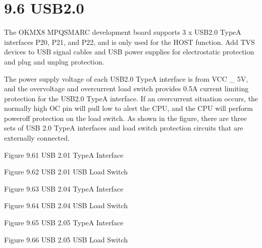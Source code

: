 \documentclass[letterpaper,10pt,openany,english]{sphinxmanual}
\begin{document}
\section{9.6 USB2.0}
\label{\detokenize{hardware:usb2-0}}
\sphinxAtStartPar
The OK\sphinxhyphen{}MX8 MPQ\sphinxhyphen{}SMARC development board supports 3 x USB2.0 Type\sphinxhyphen{}A interfaces P20, P21, and P22, and is only used for the HOST function. Add TVS devices to USB signal cables and USB power supplies for electrostatic protection and plug and unplug protection.

\sphinxAtStartPar
The power supply voltage of each USB2.0 Type\sphinxhyphen{}A interface is from VCC \_ 5V, and the overvoltage and overcurrent load switch provides 0.5A current limiting protection for the USB2.0 Type\sphinxhyphen{}A interface. If an overcurrent situation occurs, the normally high OC pin will pull low to alert the CPU, and the CPU will perform power\sphinxhyphen{}off protection on the load switch. As shown in the figure, there are three sets of USB 2.0 Type\sphinxhyphen{}A interfaces and load switch protection circuits that are externally connected.

\sphinxAtStartPar
{}

\sphinxAtStartPar
Figure 9.6\sphinxhyphen{}1 USB 2.0\sphinxhyphen{}1 Type\sphinxhyphen{}A Interface

\sphinxAtStartPar
{}

\sphinxAtStartPar
Figure 9.6\sphinxhyphen{}2 USB 2.0\sphinxhyphen{}1 USB Load Switch

\sphinxAtStartPar
{}

\sphinxAtStartPar
Figure 9.6\sphinxhyphen{}3 USB 2.0\sphinxhyphen{}4 Type\sphinxhyphen{}A Interface

\sphinxAtStartPar
{}

\sphinxAtStartPar
Figure 9.6\sphinxhyphen{}4 USB 2.0\sphinxhyphen{}4 USB Load Switch

\sphinxAtStartPar
{}

\sphinxAtStartPar
Figure 9.6\sphinxhyphen{}5 USB 2.0\sphinxhyphen{}5 Type\sphinxhyphen{}A Interface

\sphinxAtStartPar
{}

\sphinxAtStartPar
Figure 9.6\sphinxhyphen{}6 USB 2.0\sphinxhyphen{}5 USB Load Switch
\end{document}
